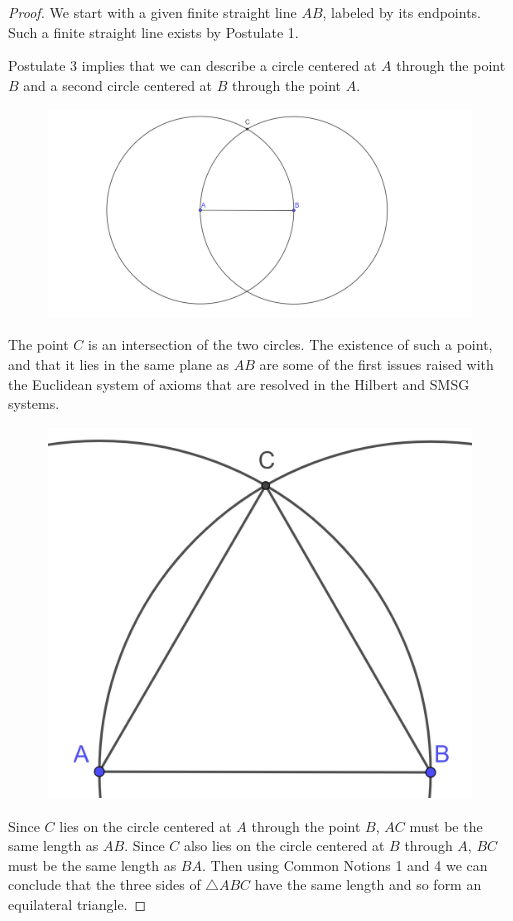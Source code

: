 \documentclass[
]{book}
\theoremstyle{definition}
\theoremstyle{definition}
\theoremstyle{definition}
\theoremstyle{definition}
\theoremstyle{remark}
\begin{document}
\begin{proof}

We start with a given finite straight line \(AB\), labeled by its endpoints. Such a finite straight line exists by Postulate 1.

Postulate 3 implies that we can describe a circle centered at \(A\) through the point \(B\) and a second circle centered at \(B\) through the point \(A\).

\begin{figure}

{\centering \includegraphics[width=0.9\linewidth]{images/Prop1b} 

}

\end{figure}

The point \(C\) is an intersection of the two circles. The existence of such a point, and that it lies in the same plane as \(AB\) are some of the first issues raised with the Euclidean system of axioms that are resolved in the Hilbert and SMSG systems.

\begin{figure}

{\centering \includegraphics[width=0.25\linewidth]{images/Prop1c} 

}

\end{figure}

Since \(C\) lies on the circle centered at \(A\) through the point \(B\), \(AC\) must be the same length as \(AB\). Since \(C\) also lies on the circle centered at \(B\) through \(A\), \(BC\) must be the same length as \(BA\). Then using Common Notions 1 and 4 we can conclude that the three sides of \(\triangle ABC\) have the same length and so form an equilateral triangle.

\end{proof}
\end{document}

